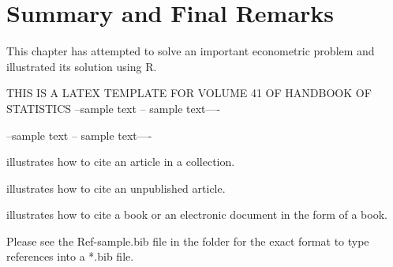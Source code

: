 \documentclass[12pt]{article}
\begin{document}
\section{Summary and Final Remarks}
This chapter has attempted to solve an important econometric
problem and illustrated its solution using R.


THIS IS A LATEX TEMPLATE FOR VOLUME 41 OF HANDBOOK OF STATISTICS
--sample text -- sample text----

--sample text -- sample text----

\cite{Vinodb93} illustrates how to cite an article in a collection.

\cite{Vinodu07} illustrates how to cite an unpublished article.

\cite{R18} illustrates how to cite a book or an electronic document
in the form of a book.

Please see the Ref-sample.bib file in the folder for the exact format to type
references into a *.bib file.	





\end{document}
